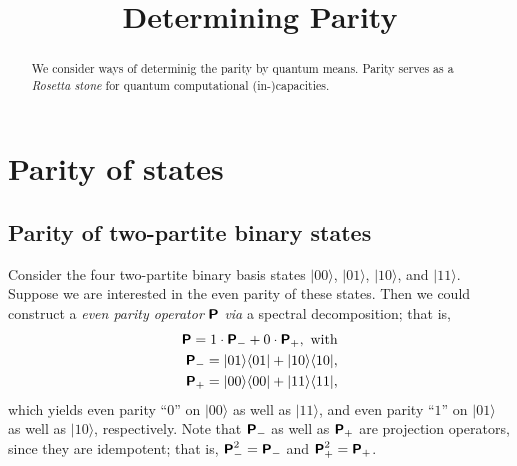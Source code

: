 \documentclass[%
 12pt,
 reprint,
  twocolumn,
 showpacs,
 showkeys,
 preprintnumbers,
 amsmath,amssymb,
 aps,
  pra,
  longbibliography,
 ]{revtex4-1}
\begin{document}
\title{Determining Parity}




\begin{abstract}
We consider ways of determinig the parity by quantum means.
Parity serves as a {\em Rosetta stone} for quantum computational (in-)capacities.
\end{abstract}

\maketitle




\section{Parity of states}

\subsection{Parity of two-partite binary states}

Consider the four two-partite binary basis states
$\vert 00 \rangle$,
$\vert 01 \rangle$,
$\vert 10 \rangle$,
and
$\vert 11 \rangle$.
Suppose we are interested in the even parity of these states.
Then we could construct a {\em even parity operator}
$\textsf{\textbf{P}}$
{\em via} a spectral decomposition; that is,
\begin{equation}
\begin{split}
\textsf{\textbf{P}} = 1 \cdot \textsf{\textbf{P}}_- + 0 \cdot \textsf{\textbf{P}}_+, \text { with}\\
\textsf{\textbf{P}}_- =  \vert 01 \rangle \langle 01 \vert + \vert 10 \rangle \langle 10 \vert,\\
\textsf{\textbf{P}}_+ =  \vert 00 \rangle \langle 00 \vert + \vert 11 \rangle \langle 11 \vert
,
\end{split}
\end{equation}
which yields even parity ``$0$'' on $\vert 00 \rangle$ as well as $\vert 11 \rangle$,
and
even parity ``$1$'' on $\vert 01 \rangle$ as well as $\vert 10 \rangle$, respectively.
Note that $\textsf{\textbf{P}}_-$
as well as
$\textsf{\textbf{P}}_+$
are projection operators, since they are idempotent; that is,
$\textsf{\textbf{P}}_-^2=\textsf{\textbf{P}}_-$ and
$\textsf{\textbf{P}}_+^2=\textsf{\textbf{P}}_+$.
\end{document}
